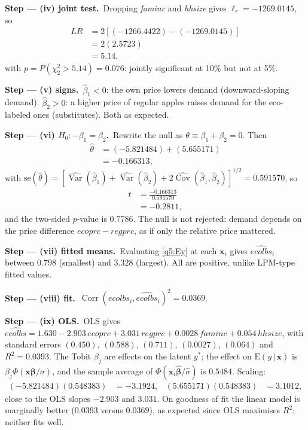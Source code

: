 \documentclass[11pt,a4paper]{article}
\numberwithin{equation}{questao}
\newcommand{\passo}[2]{\par\smallskip\noindent\textbf{Step --- #1.}~#2}
\newcommand{\var}[1]{\mathit{#1}}
\newcommand{\E}{\mathrm{E}}
\begin{document}
\begin{sol}
\passo{(iv) joint test}{Dropping \textit{faminc} and \textit{hhsize} gives $\ell_r=-1269.0145$, so
\begin{align*}
LR&=2\left[(-1266.4422)-(-1269.0145)\right]\\
&=2(2.5723)\\
&=5.14,
\end{align*}
with $p=P(\chi^2_2>5.14)=0.076$: jointly significant at 10\% but not at 5\%.}

\passo{(v) signs}{$\hat\beta_1<0$: the own price lowers demand (downward-sloping demand). $\hat\beta_2>0$: a
higher price of regular apples raises demand for the eco-labeled ones (substitutes). Both as expected.}

\passo{(vi) $H_0\colon-\beta_1=\beta_2$}{Rewrite the null as $\theta\equiv\beta_1+\beta_2=0$. Then
\begin{align*}
\hat\theta&=(-5.821484)+(5.655171)\\
&=-0.166313,
\end{align*}
with $\mathrm{se}(\hat\theta)=[\widehat{\operatorname{Var}}(\hat\beta_1)+\widehat{\operatorname{Var}}(\hat\beta_2)+2\widehat{\operatorname{Cov}}(\hat\beta_1,\hat\beta_2)]^{1/2}=0.591570$, so
\begin{align*}
t&=\frac{-0.166313}{0.591570}\\
&=-0.2811,
\end{align*}
and the two-sided $p$-value is $0.7786$. The null is not rejected: demand depends on the price
difference $\var{ecoprc}-\var{regprc}$, as if only the relative price mattered.}

\passo{(vii) fitted means}{Evaluating \eqref{q5:Ey} at each $\mathbf{x}_i$ gives $\widehat{\var{ecolbs}}_i$
between $0.798$ (smallest) and $3.328$ (largest). All are positive, unlike LPM-type fitted values.}

\passo{(viii) fit}{$\operatorname{Corr}(\var{ecolbs}_i,\widehat{\var{ecolbs}}_i)^2=0.0369$.}

\passo{(ix) OLS}{OLS gives
$\widehat{\var{ecolbs}}=1.630-2.903\,\var{ecoprc}+3.031\,\var{regprc}+0.0028\,\var{faminc}+0.054\,\var{hhsize}$,
with standard errors $(0.450)$, $(0.588)$, $(0.711)$, $(0.0027)$, $(0.064)$ and $R^2=0.0393$.
The Tobit $\beta_j$ are effects on the latent $y^*$; the effect on $\E(y\,|\,\mathbf{x})$ is
$\beta_j\Phi(\mathbf{x}\boldsymbol\beta/\sigma)$, and the sample average of $\Phi(\mathbf{x}_i\hat{\boldsymbol\beta}/\hat\sigma)$ is $0.5484$. Scaling:
\begin{align*}
(-5.821484)(0.548383)&=-3.1924, & (5.655171)(0.548383)&=3.1012,
\end{align*}
close to the OLS slopes $-2.903$ and $3.031$. On goodness of fit the linear model is marginally better
($0.0393$ versus $0.0369$), as expected since OLS maximises $R^2$; neither fits well.}


\end{sol}
\end{document}
